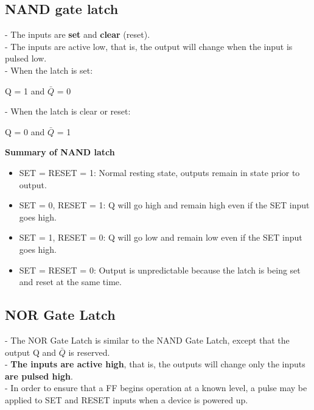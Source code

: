 \documentclass[12pt]{article}
\begin{document}
\subsection{NAND gate latch}
- The inputs are \textbf{set} and \textbf{clear} (reset). \\
- The inputs are active low, that is, the output will change when the input is pulsed low. \\
- When the latch is set:
\begin{center}
Q = 1 and $\bar{Q}$ = 0
\end{center}
- When the latch is clear or reset:
\begin{center}
Q = 0 and $\bar{Q}$ = 1
\end{center}
\textbf{Summary of NAND latch} \\
\begin{itemize}
	\item SET = RESET = 1: Normal resting state, outputs remain in state prior to output.
	\item  SET = 0, RESET = 1: Q will go high and remain high even if the SET input goes high.
	\item SET = 1, RESET = 0: Q will go low and remain low even if the SET input goes high.
	\item SET = RESET = 0: Output is unpredictable because the latch is being set and reset at the same time.
\end{itemize}
\subsection{NOR Gate Latch}
- The NOR Gate Latch is similar to the NAND Gate Latch, except that the output Q and $\bar{Q}$ is reserved. \\
- \textbf{The inputs are active high}, that is, the outputs will change only the inputs \textbf{are pulsed high}. \\
- In order to ensure that a FF begins operation at a known level, a pulse may be applied to SET and RESET inputs when a device is powered up.
\end{document}

